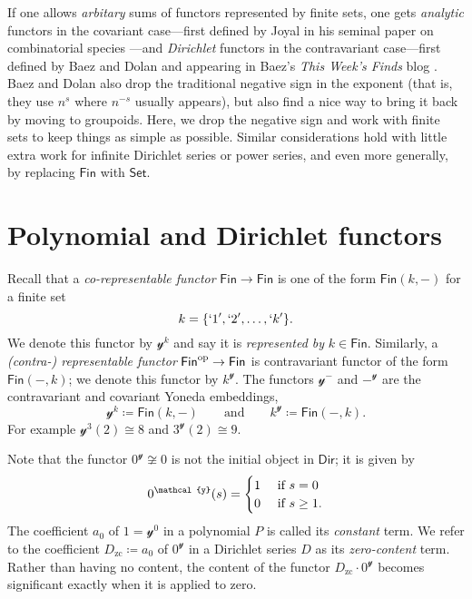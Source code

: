 \documentclass[11pt, article, one side]{memoir}
\theoremstyle{theorem}
\theoremstyle{definition}
\theoremstyle{remark}
\newcommand{\Cat}[1]{\mathsf{#1}}%
\newcommand{\op}{^\tn{op}}
\newcommand{\tn}[1]{\textnormal{#1}}
\newcommand{\smset}{\Cat{Set}}
\newcommand{\finset}{\Cat{Fin}}
\newcommand{\zero}[1]{#1_\text{zc}}
\newcommand{\yon}{\mathcal{y}}
\newcommand{\poly}{\Cat{Poly}}
\newcommand{\dir}{\Cat{Dir}}
\newcommand{\mdot}{{\cdot}}
\newcommand{\qqand}{\qquad\text{and}\qquad}
\begin{document}
If one allows \emph{arbitary} sums of functors represented by finite sets, one gets \emph{analytic} functors in the covariant case---first defined by Joyal in his seminal paper on combinatorial species \cite{J:Combinatorial.Species}---and \emph{Dirichlet} functors in the contravariant case---first defined by Baez and Dolan and appearing in Baez's \emph{This Week's Finds} blog \cite{BD:This.Weeks.Finds.300}. Baez and Dolan also drop the traditional negative sign in the exponent (that is, they use $n^s$ where $n^{-s}$ usually appears), but also find a nice way to bring it back by moving to groupoids. Here, we drop the negative sign and work with finite sets to keep things as simple as possible. Similar considerations hold with little extra work for infinite Dirichlet series or power series, and even more generally, by replacing $\finset$ with $\smset$. 



\chapter{Polynomial and Dirichlet functors}

Recall that a \emph{co-representable functor} $\finset\to\finset$ is one of the form $\finset(k, -)$ for a finite set
\[k=\{`1', `2',\ldots,`k'\}.\]
We denote this functor by $\yon^k$ and say it is \emph{represented by} $k\in\finset$. Similarly, a \emph{(contra-) representable functor} $\finset\op\to\finset$ is contravariant functor of the form $\finset(-,k)$; we denote this functor by $k^\yon$. The functors $\yon^-$ and $-^\yon$ are the contravariant and covariant Yoneda embeddings,
\[
  \yon^k \coloneqq \finset(k,-)
  \qqand
  k^\yon\coloneqq\finset(-,k).
\]
For example $\yon^3(2)\cong8$ and $3^\yon(2)\cong9$.

Note that the functor $0^\yon\not\cong 0$ is not the initial object in $\dir$; it is given by
\[
0^\yon(s)=
\begin{cases}
1&\tn{ if } s=0\\
0&\tn{ if } s\geq1.
\end{cases}
\]
The coefficient $a_0$ of $1=\yon^0$ in a polynomial $P$ is called its \emph{constant} term. We refer to the coefficient $\zero{D}\coloneqq a_0$ of $0^\yon$ in a Dirichlet series $D$ as its \emph{zero-content} term. Rather than having no content, the content of the functor $\zero{D}\mdot0^\yon$ becomes significant exactly when it is applied to zero.
\end{document}

